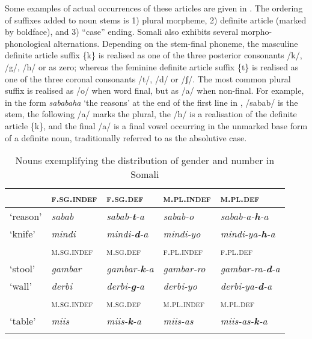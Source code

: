 \documentclass[output=paper]{langsci/langscibook}
\begin{document}
Some examples of actual occurrences of these articles are given in . The ordering of suffixes added to noun stems is 
1) plural morpheme, 
2) definite article (marked by boldface), 
and 3) “case” ending. Somali also exhibits several morpho-phonological alternations. Depending on the stem-final phoneme, the masculine definite article suffix \{k\} is realised as one of the three posterior consonants /k/, /g/, /h/ or as zero; whereas the feminine definite article suffix \{t\} is realised as one of the three coronal consonants /t/, /d/ or /ʃ/. The most common plural suffix is realised as /o/ when word final, but as /a/ when non-final. For example, in the form \textit{sababaha} ‘the reasons’ at the end of the first line in , /sabab/ is the stem, the following /a/ marks the plural, the /h/ is a realisation of the definite article \{k\}, and the final /a/ is a final vowel occurring in the unmarked base form of a definite noun, traditionally referred to as the absolutive case.
 
\begin{table}
\caption{Nouns exemplifying the distribution of gender and number in Somali}
\label{tab:nilsson:2}

\begin{tabularx}{\textwidth}{llXlX}
\lsptoprule
& {\textsc{f.sg.indef}} & {\textsc{f.sg.def}} & {\textsc{m.pl.indef}} & {\textsc{m.pl.def}}\\
\midrule
{‘reason’} & {\textit{sabab}} & {\textit{sabab-}\textbf{\textit{t}}\textit{-a}} & {\textit{sabab-o}} & {\textit{sabab-a-}\textbf{\textit{h}}\textit{-a}} \\

{‘knife’} & {\textit{mindi}} & {\textit{mindi-}\textbf{\textit{d}}\textit{-a}} &  {\textit{mindi-yo}} &  {\textit{mindi-ya-}\textbf{\textit{h}}\textit{-a}}\\

\tablevspace
& {\textsc{m.sg.indef}} & {\textsc{m.sg.def}} & {\textsc{f.pl.indef}} & {\textsc{f.pl.def}}\\
\midrule
{‘stool’}  & {\textit{gambar}} & {\textit{gambar-}\textbf{\textit{k}}\textit{-a}} & {\textit{gambar-ro}} & {\textit{gambar-ra-}\textbf{\textit{d}}\textit{-a}} \\

{‘wall’} & {\textit{derbi}} & {\textit{derbi-}\textbf{\textit{g}}\textit{-a}} & {\textit{derbi-yo}} & 
{\textit{derbi-ya-}\textbf{\textit{d}}\textit{-a}} \\

\tablevspace
& {\textsc{m.sg.indef}} & {\textsc{m.sg.def}} & {\textsc{m.pl.indef}} & {\textsc{m.pl.def}}\\

\midrule
{‘table’} & {\textit{miis}} & {\textit{miis-}\textbf{\textit{k}}\textit{-a}} & {\textit{miis-as}} & {\textit{miis-as-}\textbf{\textit{k}}\textit{-a}} \\
\lspbottomrule
\end{tabularx}

\end{table} 
\end{document}

